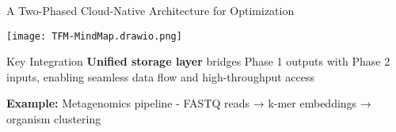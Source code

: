 \documentclass[aspectratio=169]{beamer}
\begin{document}
\begin{frame}{A Two-Phased Cloud-Native Architecture for Optimization}
    \begin{center}
        \texttt{[image: TFM-MindMap.drawio.png]}
    \end{center}
    
    \vspace{0.3cm}
    \begin{block}{Key Integration}
        \textbf{Unified storage layer} bridges Phase 1 outputs with Phase 2 inputs, enabling seamless data flow and high-throughput access
    \end{block}
    
    \vspace{0.2cm}
    \textbf{Example:} Metagenomics pipeline - FASTQ reads → k-mer embeddings → organism clustering
\end{frame}
\end{document}

